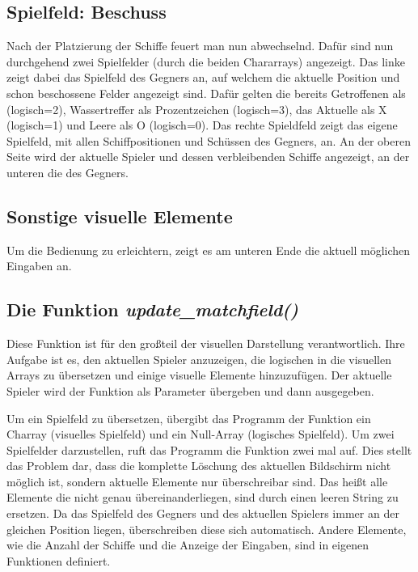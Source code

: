 \documentclass{llncs}
\begin{document}
\subsection{Spielfeld: Beschuss}

Nach der Platzierung der Schiffe feuert man nun abwechselnd. Dafür sind nun durchgehend zwei Spielfelder (durch die beiden Chararrays) angezeigt. Das linke zeigt dabei das Spielfeld des Gegners an, auf welchem die aktuelle Position und
schon beschossene Felder angezeigt sind. Dafür gelten die bereits Getroffenen als \glqq *\grqq{} (logisch=2), Wassertreffer als \glqq Prozentzeichen\grqq{} (logisch=3), das Aktuelle als \glqq X\grqq{} (logisch=1) und Leere als \glqq O\grqq{} (logisch=0). 
Das rechte Spieldfeld zeigt das eigene Spielfeld, mit allen Schiffpositionen und Schüssen des Gegners, an. An der oberen Seite wird der aktuelle Spieler und dessen verbleibenden Schiffe angezeigt, an
der unteren die des Gegners.

\subsection{Sonstige visuelle Elemente}

Um die Bedienung zu erleichtern, zeigt es am unteren Ende die aktuell möglichen Eingaben an.

\subsection{Die Funktion \emph{update\_matchfield()}}

Diese Funktion ist für den großteil der visuellen Darstellung verantwortlich. Ihre Aufgabe ist es, den aktuellen Spieler anzuzeigen, die logischen in die visuellen Arrays zu übersetzen
und einige visuelle Elemente hinzuzufügen. Der aktuelle Spieler wird der Funktion als Parameter übergeben und dann ausgegeben.

Um ein Spielfeld zu übersetzen, übergibt das Programm der Funktion ein Charray (visuelles Spielfeld) und ein Null-Array (logisches Spielfeld). Um zwei Spielfelder darzustellen,
ruft das Programm die Funktion zwei mal auf. Dies stellt das Problem dar, dass die komplette Löschung des aktuellen Bildschirm nicht möglich ist, sondern aktuelle Elemente nur überschreibar sind.
Das heißt alle Elemente die nicht genau übereinanderliegen, sind durch einen leeren String zu ersetzen. Da das Spielfeld des Gegners und des aktuellen Spielers
immer an der gleichen Position liegen, überschreiben diese sich automatisch. Andere Elemente, wie die Anzahl der Schiffe und die Anzeige der Eingaben, sind in eigenen Funktionen definiert.
\end{document}
